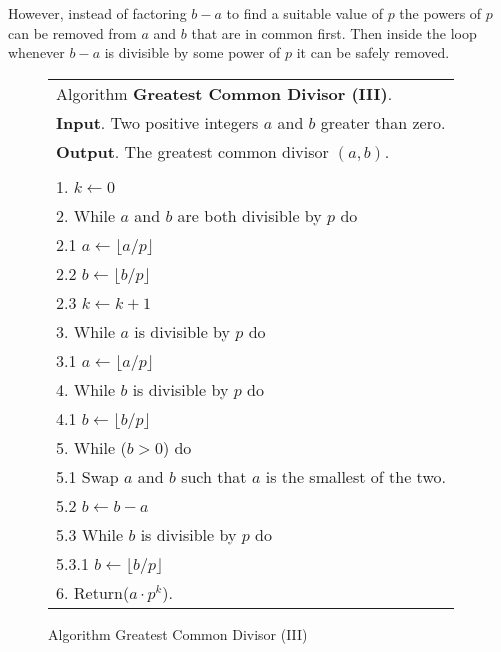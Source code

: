 \documentclass[b5paper]{book}
\begin{document}
However, instead of factoring $b - a$ to find a suitable value of $p$ the powers of $p$ can be removed from $a$ and $b$ that are in common first.  
Then inside the loop whenever $b - a$ is divisible by some power of $p$ it can be safely removed.  

\begin{figure}[!here]
\begin{small}
\begin{center}
\begin{tabular}{l}
\hline Algorithm \textbf{Greatest Common Divisor (III)}. \\
\textbf{Input}.   Two positive integers $a$ and $b$ greater than zero. \\
\textbf{Output}.  The greatest common divisor $(a, b)$.  \\
\hline \\
1.  $k \leftarrow 0$ \\
2.  While $a$ and $b$ are both divisible by $p$ do \\
\hspace{3mm}2.1  $a \leftarrow \lfloor a / p \rfloor$ \\
\hspace{3mm}2.2  $b \leftarrow \lfloor b / p \rfloor$ \\
\hspace{3mm}2.3  $k \leftarrow k + 1$ \\
3.  While $a$ is divisible by $p$ do \\
\hspace{3mm}3.1  $a \leftarrow \lfloor a / p \rfloor$ \\
4.  While $b$ is divisible by $p$ do \\
\hspace{3mm}4.1  $b \leftarrow \lfloor b / p \rfloor$ \\
5.  While ($b > 0$) do \\
\hspace{3mm}5.1  Swap $a$ and $b$ such that $a$ is the smallest of the two. \\
\hspace{3mm}5.2  $b \leftarrow b - a$ \\
\hspace{3mm}5.3  While $b$ is divisible by $p$ do \\
\hspace{6mm}5.3.1  $b \leftarrow \lfloor b / p \rfloor$ \\
6.  Return($a \cdot p^k$). \\
\hline
\end{tabular}
\end{center}
\end{small}
\caption{Algorithm Greatest Common Divisor (III)}
\label{fig:gcd3}
\end{figure}
\end{document}
